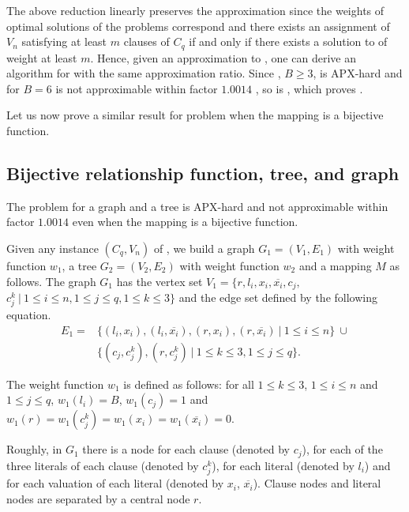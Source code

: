 		The above reduction linearly preserves the approximation since the weights of optimal solutions of the problems correspond and there exists an assignment of $V_n$ satisfying at least $m$ clauses of $C_q$ if and only if there exists a solution to \mwccs{} of weight at least $m$. Hence, given an approximation to \mwccs{}, one can derive an algorithm for \msat{} with the same approximation ratio. Since \msat{}, $B\geq 3$, is APX-hard \parencite{papadimitriou1991optimization} and \msat{} for $B=6$ is not approximable within factor $1.0014$ \parencite{berman1999some}, so is \mwccs{}, which proves .

		Let us now prove a similar result for \mwccs{} problem when the mapping is a bijective function.


		\subsection{Bijective relationship function, tree, and graph}
		\label{subsec:apx-t-graph}

		\begin{proposition}\label{prop:apx-t-graph}
  	  	  The \mwccs{} problem for a graph and a tree is APX-hard and not approximable within factor $1.0014$ even when the mapping is a bijective function.%
		\end{proposition}

		Given any instance $(C_q,V_n)$ of \msat{}, we build a graph $G_1=(V_1,E_1)$ with weight function $w_1$, a tree $G_2=(V_2,E_2)$ with weight function $w_2$ and a mapping $M$ as follows. The graph $G_1$ has the vertex set $V_1=\{r, l_i, x_i, \overline{x_i}, c_j,$ $ c^k_j ~\vert~ 1\leq i\leq n, 1\leq j \leq q, 1\leq k \leq 3\}$ and the edge set defined by the following equation.
		\begin{align*}
		E_1= & \{(l_i,x_i), (l_i,\overline{x_i}), (r,x_i), (r,\overline{x_i}) ~\vert~ 1\leq i\leq n\} ~\cup  \\
 	 	 & \{(c_j,c_j^k), (r,c_j^k)  ~\vert~ 1\leq k \leq 3, 1\leq j \leq q\}.
		\end{align*}

		The weight function $w_1$ is defined as follows: for all $1\leq k \leq 3$, $1\leq i\leq n$ and $1\leq j \leq q$, $w_1(l_i)=B$, $w_1(c_j)=1$ and $w_1(r)=w_1(c_j^k)=w_1(x_i)=w_1(\overline{x_i})=0$.

		Roughly, in $G_1$ there is a node for each clause (denoted by $c_j$), for each of the three literals of each clause (denoted by $c_j^k$), for each literal (denoted by $l_i$) and for each valuation of each literal (denoted by $x_i$, $\overline{x_i}$). Clause nodes and literal nodes are separated by a central node $r$.

